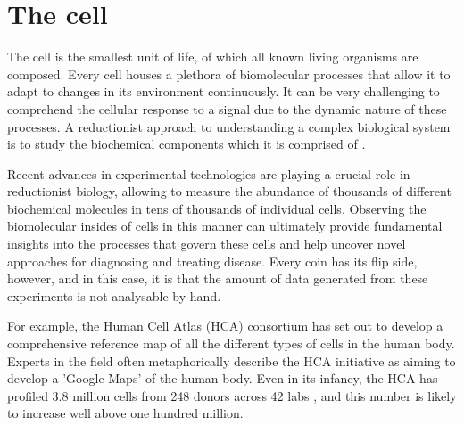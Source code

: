 
\section{The cell}
The cell is the smallest unit of life, of which all known living organisms are composed. Every cell houses a plethora of biomolecular processes that allow it to adapt to changes in its environment continuously. It can be very challenging to comprehend the cellular response to a signal due to the dynamic nature of these processes. A reductionist approach to understanding a complex biological system is to study the biochemical components which it is comprised of \cite{brigandt_reductionismbiology_2017}.

Recent advances in experimental technologies are playing a crucial role in reductionist biology, allowing to measure the abundance of thousands of different biochemical molecules in tens of thousands of individual cells. Observing the biomolecular insides of cells in this manner can ultimately provide fundamental insights into the processes that govern these cells and help uncover novel approaches for diagnosing and treating disease. Every coin has its flip side, however, and in this case, it is that the amount of data generated from these experiments is not analysable by hand.  

For example, the Human Cell Atlas (HCA) consortium \cite{regev_humancellatlas_2018} has set out to develop a comprehensive reference map of all the different types of cells in the human body. Experts in the field often metaphorically describe the HCA initiative as aiming to develop a 'Google Maps' of the human body. Even in its infancy, the HCA has profiled 3.8 million cells from 248 donors across 42 labs \cite{humancellatlasconsortium_humancellatlas_2018}, and this number is likely to increase well above one hundred million.



